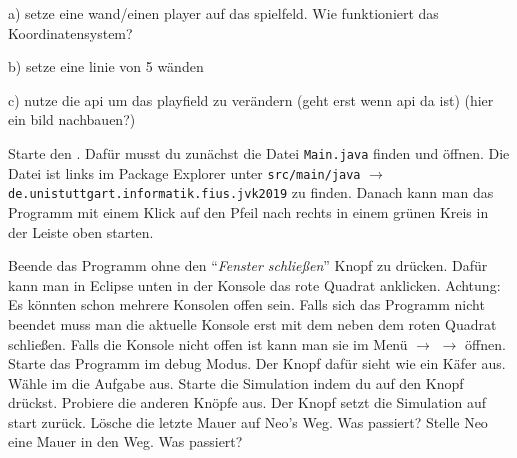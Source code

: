 


a) setze eine wand/einen player auf das spielfeld. Wie funktioniert das Koordinatensystem?

b) setze eine linie von 5 wänden

c) nutze die api um das playfield zu verändern (geht erst wenn api da ist) (hier ein bild nachbauen?)





Starte den \simulator.
Dafür musst du zunächst die Datei \texttt{Main.java} finden und öffnen.
Die Datei ist links im Package Explorer unter \texttt{src/main/java} $\to$ \texttt{de.unistuttgart.informatik.fius.jvk2019} zu finden.
Danach kann man das Programm mit einem Klick auf den Pfeil nach rechts in einem grünen Kreis in der Leiste oben starten.


    \subexcercise Beende das Programm ohne den "`\textit{Fenster schließen}"' Knopf zu drücken.
        Dafür kann man in Eclipse unten in der Konsole das rote Quadrat anklicken.
        Achtung: Es könnten schon mehrere Konsolen offen sein.
        Falls sich das Programm nicht beendet muss man die aktuelle Konsole erst mit dem  neben dem roten Quadrat schließen.
        Falls die Konsole nicht offen ist kann man sie im Menü  $\to$  $\to$  öffnen.
    \subexcercise Starte das Programm im debug Modus.
        Der Knopf dafür sieht wie ein Käfer aus.
    \subexcercise Wähle im \simulator{} die Aufgabe  aus.
        Starte die Simulation indem du auf den  Knopf drückst.
        Probiere die anderen Knöpfe aus.
        Der  Knopf setzt die Simulation auf start zurück.
    \subexcercise Lösche die letzte Mauer auf Neo's Weg.
        Was passiert?
    \subexcercise Stelle Neo eine Mauer in den Weg.
        Was passiert?

